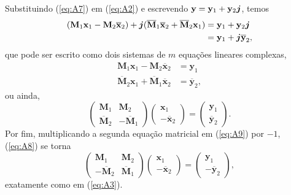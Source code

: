\documentclass[
	11pt,				%
	openright,			%
	twoside,			%
	a4paper,			%
	french,				%
	brazil,			%
	english				%
	]{abntex2}
\begin{document}
\begin{apendicesenv}
Substituindo (\ref{eq:A7}) em (\ref{eq:A2}) e escrevendo $ \mathbf{y} = \mathbf{y}_1 + \mathbf{y}_2 \boldsymbol{j}$, temos
\begin{equation}
\begin{aligned}
(\mathbf{M}_1 \mathbf{x}_1 - \mathbf{M}_2 \overline{\mathbf{x}}_2) + \boldsymbol{j} (\overline{\mathbf{M}}_1 \overline{\mathbf{x}}_2 + \overline{\mathbf{M}}_2 \mathbf{x}_1) &=
\mathbf{y}_1 + \mathbf{y}_2 \boldsymbol{j} \\
&= \mathbf{y}_1 + \boldsymbol{j} \overline{\mathbf{y}}_2,
\end{aligned}
\end{equation}
que pode ser escrito como dois sistemas de $ m $ equa\c c\~oes lineares complexas,
\begin{equation}
\label{eq:A9}
\begin{aligned}
\mathbf{M}_1 \mathbf{x}_1 - \mathbf{M}_2 \overline{\mathbf{x}}_2 &= \mathbf{y}_1 \\
\overline{\mathbf{M}}_2 \mathbf{x}_1 + \overline{\mathbf{M}}_1 \overline{\mathbf{x}}_2&= \overline{\mathbf{y}}_2,
\end{aligned}
\end{equation}
ou ainda,
\begin{equation}
\label{eq:A8}
\begin{pmatrix}
\mathbf{M}_1 & \mathbf{M}_2\\ 
\overline{\mathbf{M}}_2 & - \overline{\mathbf{M}}_1
\end{pmatrix}
\begin{pmatrix}
\mathbf{x}_1 \\ 
- \overline{\mathbf{x}}_2
\end{pmatrix}
=
\begin{pmatrix}
\mathbf{y}_1 \\ 
\overline{\mathbf{y}}_2
\end{pmatrix}.
\end{equation}
Por fim, multiplicando a segunda equa\c c\~ao matricial em (\ref{eq:A9}) por $ -1 $, (\ref{eq:A8}) se torna
\begin{equation}
\label{eq:10}
\begin{pmatrix}
\mathbf{M}_1 & \mathbf{M}_2\\ 
- \overline{\mathbf{M}}_2 & \overline{\mathbf{M}}_1
\end{pmatrix}
\begin{pmatrix}
\mathbf{x}_1 \\ 
- \overline{\mathbf{x}}_2
\end{pmatrix}
=
\begin{pmatrix}
\mathbf{y}_1 \\ 
- \overline{\mathbf{y}}_2
\end{pmatrix},
\end{equation}
exatamente como em (\ref{eq:A3}).

\end{apendicesenv}
\end{document}
